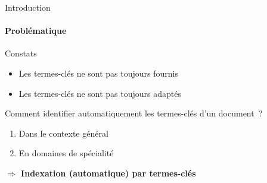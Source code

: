 \begin{frame}{Introduction}\framesubtitle{Problématique}
  \begin{alertblock}{Constats}
    \begin{itemize}
      \item{Les termes-clés ne sont pas toujours fournis}
      \item{Les termes-clés ne sont pas toujours adaptés}
    \end{itemize}
  \end{alertblock}

  \vspace{1em}

  Comment identifier automatiquement les termes-clés d'un document~?
  \begin{enumerate}
    \item{Dans le contexte général}
    \item{En domaines de spécialité}
  \end{enumerate}

  \vspace{1em}

  \large\textbf{$\Rightarrow$ Indexation (automatique) par termes-clés}
\end{frame}


